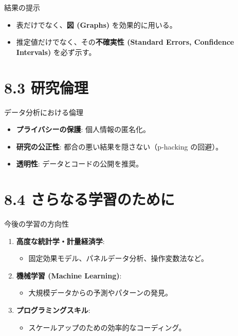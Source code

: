 \documentclass[
  ignorenonframetext,
]{beamer}
\providecommand{\tightlist}{%
  \setlength{\itemsep}{0pt}\setlength{\parskip}{0pt}}
\begin{document}
\begin{frame}{結果の提示}
\protect\hypertarget{ux7d50ux679cux306eux63d0ux793a}{}
\begin{itemize}
\tightlist
\item
  表だけでなく、\textbf{図 (Graphs)} を効果的に用いる。
\item
  推定値だけでなく、その\textbf{不確実性 (Standard Errors, Confidence
  Intervals)} を必ず示す。
\end{itemize}
\end{frame}

\hypertarget{ux7814ux7a76ux502bux7406}{%
\section{8.3 研究倫理}\label{ux7814ux7a76ux502bux7406}}

\begin{frame}{データ分析における倫理}
\protect\hypertarget{ux30c7ux30fcux30bfux5206ux6790ux306bux304aux3051ux308bux502bux7406}{}
\begin{itemize}
\tightlist
\item
  \textbf{プライバシーの保護}: 個人情報の匿名化。
\item
  \textbf{研究の公正性}: 都合の悪い結果を隠さない（p-hacking の回避）。
\item
  \textbf{透明性}: データとコードの公開を推奨。
\end{itemize}
\end{frame}

\hypertarget{ux3055ux3089ux306aux308bux5b66ux7fd2ux306eux305fux3081ux306b}{%
\section{8.4
さらなる学習のために}\label{ux3055ux3089ux306aux308bux5b66ux7fd2ux306eux305fux3081ux306b}}

\begin{frame}{今後の学習の方向性}
\protect\hypertarget{ux4ecaux5f8cux306eux5b66ux7fd2ux306eux65b9ux5411ux6027}{}
\begin{enumerate}
\tightlist
\item
  \textbf{高度な統計学・計量経済学}:

  \begin{itemize}
  \tightlist
  \item
    固定効果モデル、パネルデータ分析、操作変数法など。
  \end{itemize}
\item
  \textbf{機械学習 (Machine Learning)}:

  \begin{itemize}
  \tightlist
  \item
    大規模データからの予測やパターンの発見。
  \end{itemize}
\item
  \textbf{プログラミングスキル}:

  \begin{itemize}
  \tightlist
  \item
    スケールアップのための効率的なコーディング。
  \end{itemize}
\end{enumerate}
\end{frame}
\end{document}
